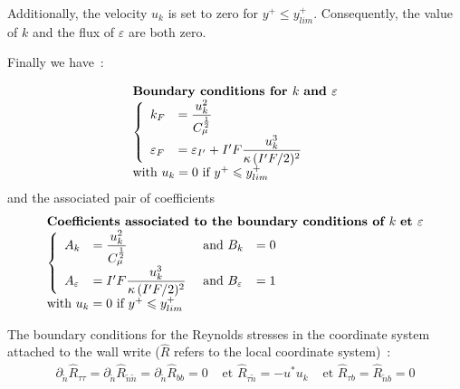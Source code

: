 Additionally, the velocity $u_k$ is set to zero for $y^+\leqslant y^+_{lim}$.
Consequently, the value of $k$ and the flux of $\varepsilon$ are both zero.

Finally we have~:

\begin{equation}
\begin{array}{l}
\text{\bf Boundary conditions for } k \text { \bf and } \varepsilon \\
\left\{\begin{array}{ll}
k_F&= \displaystyle\frac{u_k^2}{C_\mu^\frac{1}{2}}\\
\varepsilon_F&=\varepsilon_{I'}+I'F\displaystyle\frac{ u_k^3}{\kappa\, (I'F/2)^2}
\end{array}\right. \\
\text{with } u_k = 0 \text { if } y^+\leqslant y^+_{lim}
\end{array}
\end{equation}
and the associated pair of coefficients
\begin{equation}
\begin{array}{l}
\text{\bf Coefficients associated to the boundary conditions of }
k \text { \bf et } \varepsilon \\
\left\{\begin{array}{llll}
A_k&= \displaystyle\frac{u_k^2}{C_\mu^\frac{1}{2}} &\text{ and } B_k&= 0 \\
A_\varepsilon&=I'F\displaystyle\frac{ u_k^3}{\kappa\, (I'F/2)^2}&\text{ and } B_\varepsilon&= 1
\end{array}\right.\\
\text{with } u_k = 0 \text { if } y^+\leqslant y^+_{lim}
\end{array}
\end{equation}








The boundary conditions for the Reynolds stresses in the coordinate system
attached to the wall write ($\hat R$ refers to the local coordinate system)~:
\begin{equation}
\begin{array}{lll}
\partial_{\tilde{n}} \hat R_{\tau\tau} = \partial_{\tilde{n}} \hat R_{\tilde{n}\tilde{n}}=\partial_{\tilde{n}} \hat R_{bb}=0  &
\text { et } \hat R_{\tau\tilde{n}} = -u^*u_k  &\text { et  } \hat R_{\tau b} = \hat R_{\tilde{n} b}
= 0
\end{array}
\end{equation}


